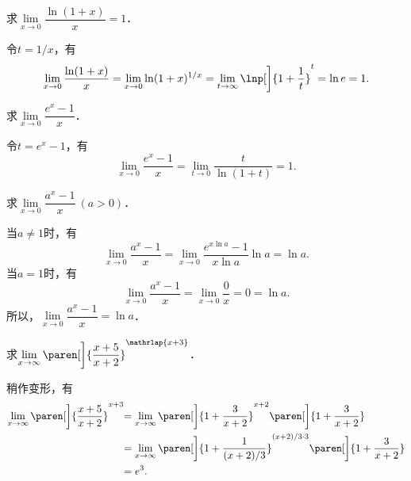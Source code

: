 \begin{example*}
  求\(\lim\limits_{x\to0} \dfrac{\ln(1+x)}{x} = 1\)．\rule{0ex}{3.5ex}

  \begin{remark}
    令\(t = 1/x\)，有
    \begin{equation*}
      \lim_{x\to0} \frac{\ln(1+x)}{x}
      = \lim_{x\to0} \ln(1+x)^{1/x}
      = \lim_{t\to\infty} \lnp[\bigg]{1 + \frac1t}^t
      = \ln e
      = 1.
    \end{equation*}
  \end{remark}
\end{example*}

\begin{example*}
  求\(\lim\limits_{x\to0} \dfrac{e^x-1}{x}\)．

  \begin{remark}
    令\(t = e^x - 1\)，有
    \begin{equation*}
      \lim_{x\to0} \frac{e^x-1}{x}
      = \lim_{t\to0} \frac{t}{\ln(1+t)}
      = 1.
    \end{equation*}
  \end{remark}
\end{example*}

\begin{example*}
  求\(\lim\limits_{x\to0} \dfrac{a^x-1}{x}\ (a > 0)\)．

  \begin{remark}
    当\(a \ne 1\)时，有
    \begin{equation*}
      \lim_{x\to0} \frac{a^x-1}{x}
      = \lim_{x\to0} \frac{e^{x \ln a}-1}{x \ln a} \ln a
      = \ln a.
    \end{equation*}
    当\(a = 1\)时，有
    \begin{equation*}
      \lim_{x\to0} \frac{a^x-1}{x}
      = \lim_{x\to0} \frac{0}{x}
      = 0 = \ln a.
    \end{equation*}
    所以，\(\lim\limits_{x\to0} \dfrac{a^x-1}{x} = \ln a\)．
  \end{remark}
\end{example*}

\begin{example*}
  求\(\lim\limits_{x\to\infty} \paren[\bigg]{\dfrac{x+5}{x+2}}^{\mathrlap{x+3}}\)．

  \begin{remark}
    稍作变形，有
    \begin{align*}
      \lim_{x\to\infty} \paren[\bigg]{\frac{x+5}{x+2}}^{x+3}\negthickspace
      &= \lim_{x\to\infty} \paren[\bigg]{1 + \frac{3}{x+2}}^{x+2} \paren[\bigg]{%
        1 + \frac{3}{x+2}} \\
      &= \lim_{x\to\infty} \paren[\bigg]{1 + \frac{1}{(x+2)/3}}^{(x+2)/3\cdot3} \paren[\bigg]{%
        1 + \frac{3}{x+2}} \\
      &= e^3.
    \end{align*}
  \end{remark}
\end{example*}

